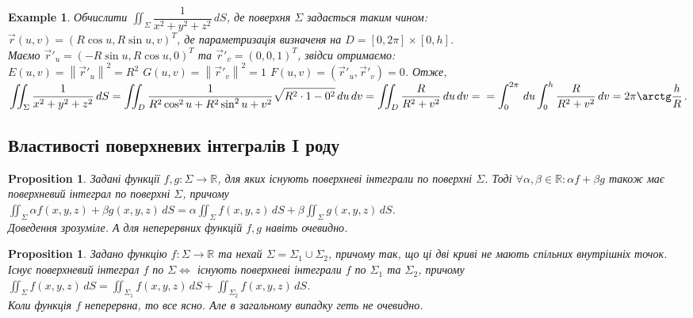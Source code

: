 \documentclass[a4paper, 10pt]{article}
\theoremstyle{theoremdd}
\theoremstyle{theoremdd}
\theoremstyle{theoremdd}
\theoremstyle{theoremdd}
\newtheorem{example}[theorem]{Example}
\theoremstyle{theoremdd}
\newtheorem{proposition}[theorem]{Proposition}
\theoremstyle{theoremdd}
\theoremstyle{theoremdd}
\theoremstyle{theoremdd}
\newcommand\Norm[1]{\left\lVert#1\right\rVert}
\begin{document}
\begin{example}
Обчислити $\displaystyle\iint_\Sigma \dfrac{1}{x^2+y^2+z^2}\,dS$, де поверхня $\Sigma$ задається таким чином:\\
$\vec{r}(u,v) = (R \cos u, R \sin u, v)^T$, де параметризація визначеня на $D = [0,2\pi] \times [0,h]$.\\
Маємо $\vec{r}'_u = (-R\sin u, R\cos u, 0)^T$ та $\vec{r}'_v = (0,0,1)^T$, звідси отримаємо:\\
$E(u,v) = \Norm{\vec{r}'_u}^2 = R^2$ \hspace{0.5cm} $G(u,v) = \Norm{\vec{r}'_v}^2 = 1$ \hspace{0.5cm} $F(u,v) = ( \vec{r}'_u, \vec{r}'_v ) = 0$. Отже,\\
$\displaystyle\iint_\Sigma \dfrac{1}{x^2+y^2+z^2}\,dS = \iint_D \dfrac{1}{R^2 \cos^2 u + R^2 \sin^2 u + v^2} \sqrt{R^2 \cdot 1 - 0^2}\,du\,dv = \iint_D \dfrac{R}{R^2+v^2}\,du\,dv = \\ = \int_{0}^{2\pi}\,du \int_0^h \dfrac{R}{R^2+v^2}\,dv = 2\pi \arctg \dfrac{h}{R}$.
\end{example}

\subsection{Властивості поверхневих інтегралів I роду}
\begin{proposition}
Задані функції $f,g: \Sigma \to \mathbb{R}$, для яких існують поверхневі інтеграли по поверхні $\Sigma$. Тоді $\forall \alpha,\beta \in \mathbb{R}: \alpha f + \beta g$ також має поверхневий інтеграл по поверхні $\Sigma$, причому\\
$\displaystyle\iint_\Sigma \alpha f(x,y,z) + \beta g(x,y,z)\,dS = \alpha \iint_\Sigma f(x,y,z)\,dS + \beta \iint_\Sigma g(x,y,z)\,dS$.\\
\textit{Доведення зрозуміле. А для неперервних функцій $f,g$ навіть очевидно.}
\end{proposition}

\begin{proposition}
Задано функцію $f: \Sigma \to \mathbb{R}$ та нехай $\Sigma = \Sigma_1 \cup \Sigma_2$, причому так, що ці дві криві не мають спільних внутрішніх точок.\\
Існує поверхневий інтеграл $f$ по $\Sigma \iff$ існують поверхневі інтеграли $f$ по $\Sigma_1$ та $\Sigma_2$, причому\\
$\displaystyle\iint_\Sigma f(x,y,z)\,dS = \iint_{\Sigma_1} f(x,y,z)\,dS + \iint_{\Sigma_2} f(x,y,z)\,dS$.\\
\textit{Коли функція $f$ неперервна, то все ясно. Але в загальному випадку геть не очевидно.}
\end{proposition}
\end{document}
